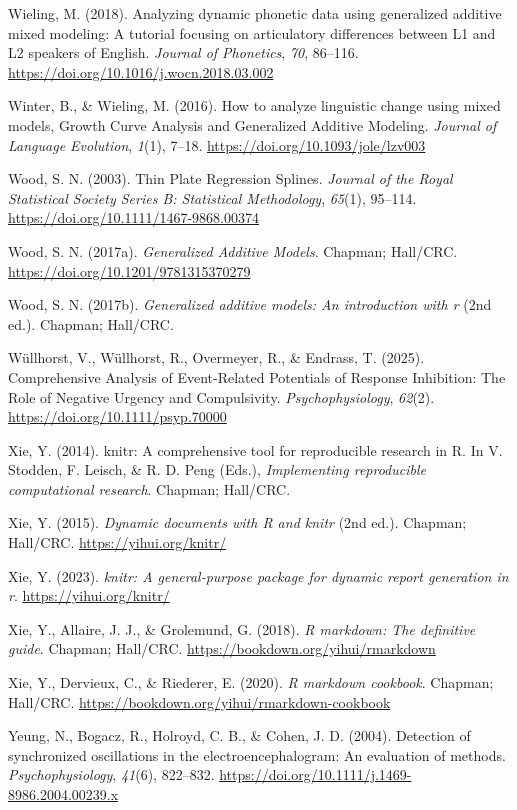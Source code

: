 \documentclass[
  doc,
  floatsintext,
  longtable,
  a4paper,
  nolmodern,
  notxfonts,
  notimes,
  colorlinks=true,linkcolor=blue,citecolor=blue,urlcolor=blue]{apa7}
\newlength{\cslhangindent}
\newenvironment{CSLReferences}[2] %
 {\begin{list}{}{%
  \setlength{\itemindent}{0pt}
  \setlength{\leftmargin}{0pt}
  \setlength{\parsep}{0pt}
  \ifodd #1
   \setlength{\leftmargin}{\cslhangindent}
   \setlength{\itemindent}{-1\cslhangindent}
  \fi
  \setlength{\itemsep}{#2\baselineskip}}}
 {\end{list}}
\begin{document}
\begin{CSLReferences}{1}{0}
Wieling, M. (2018). Analyzing dynamic phonetic data using generalized
additive mixed modeling: A tutorial focusing on articulatory differences
between L1 and L2 speakers of English. \emph{Journal of Phonetics},
\emph{70}, 86--116. \url{https://doi.org/10.1016/j.wocn.2018.03.002}

Winter, B., \& Wieling, M. (2016). How to analyze linguistic change
using mixed models, Growth Curve Analysis and Generalized Additive
Modeling. \emph{Journal of Language Evolution}, \emph{1}(1), 7--18.
\url{https://doi.org/10.1093/jole/lzv003}

Wood, S. N. (2003). Thin Plate Regression Splines. \emph{Journal of the
Royal Statistical Society Series B: Statistical Methodology},
\emph{65}(1), 95--114. \url{https://doi.org/10.1111/1467-9868.00374}

Wood, S. N. (2017a). \emph{Generalized Additive Models}. Chapman;
Hall/CRC. \url{https://doi.org/10.1201/9781315370279}

Wood, S. N. (2017b). \emph{Generalized additive models: An introduction
with r} (2nd ed.). Chapman; Hall/CRC.

Wüllhorst, V., Wüllhorst, R., Overmeyer, R., \& Endrass, T. (2025).
Comprehensive Analysis of Event{-}Related Potentials of Response
Inhibition: The Role of Negative Urgency and Compulsivity.
\emph{Psychophysiology}, \emph{62}(2).
\url{https://doi.org/10.1111/psyp.70000}

Xie, Y. (2014). {knitr}: A comprehensive tool for reproducible research
in {R}. In V. Stodden, F. Leisch, \& R. D. Peng (Eds.),
\emph{Implementing reproducible computational research}. Chapman;
Hall/CRC.

Xie, Y. (2015). \emph{Dynamic documents with {R} and knitr} (2nd ed.).
Chapman; Hall/CRC. \url{https://yihui.org/knitr/}

Xie, Y. (2023). \emph{{knitr}: A general-purpose package for dynamic
report generation in r}. \url{https://yihui.org/knitr/}

Xie, Y., Allaire, J. J., \& Grolemund, G. (2018). \emph{R markdown: The
definitive guide}. Chapman; Hall/CRC.
\url{https://bookdown.org/yihui/rmarkdown}

Xie, Y., Dervieux, C., \& Riederer, E. (2020). \emph{R markdown
cookbook}. Chapman; Hall/CRC.
\url{https://bookdown.org/yihui/rmarkdown-cookbook}

Yeung, N., Bogacz, R., Holroyd, C. B., \& Cohen, J. D. (2004). Detection
of synchronized oscillations in the electroencephalogram: An evaluation
of methods. \emph{Psychophysiology}, \emph{41}(6), 822--832.
\url{https://doi.org/10.1111/j.1469-8986.2004.00239.x}

\end{CSLReferences}
\end{document}
